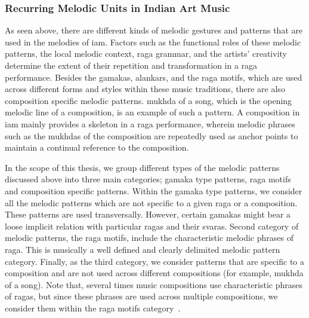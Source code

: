 \subsubsection{Recurring Melodic Units in Indian Art Music}
\label{sec:recurring_melodic_patterns_iam}

As seen above, there are different kinds of melodic gestures and patterns that are used in the melodies of \gls{iam}. Factors such as the functional roles of these melodic patterns, the local melodic context, \gls{raga} grammar, and the artists' creativity determine the extent of their repetition and transformation in a \gls{raga} performance. Besides the \glspl{gamaka}, \glspl{alankar}, and the \gls{raga} motifs, which are used across different forms and styles within these music traditions, there are also composition specific melodic patterns. \Gls{mukhda} of a song, which is the opening melodic line of a composition, is an example of such a pattern. A composition in \gls{iam} mainly provides a skeleton in a \gls{raga} performance, wherein melodic phrases such as the \glspl{mukhda} of the composition are repeatedly used as anchor points to maintain a continual reference to the composition.%

In the scope of this thesis, we group different types of the melodic patterns discussed above into three main categories; \gls{gamaka} type patterns, \gls{raga} motifs and composition specific patterns. Within the \gls{gamaka} type patterns, we consider all the melodic patterns which are not specific to a given \gls{raga} or a composition. These patterns are used transversally. However, certain \glspl{gamaka} might bear a loose implicit relation with particular \glspl{raga} and their \glspl{svara}. Second category of melodic patterns, the \gls{raga} motifs, include the characteristic melodic phrases of \gls{raga}. This is musically a well defined and clearly delimited melodic pattern category. Finally, as the third category, we consider patterns that are specific to a composition and are not used across different compositions (for example, \gls{mukhda} of a song). Note that, several times music compositions use characteristic phrases of \glspl{raga}, but since these phrases are used across multiple compositions, we consider them within the \gls{raga} motifs category~\citep{meer1980hindustani,Bagchee1998}.


